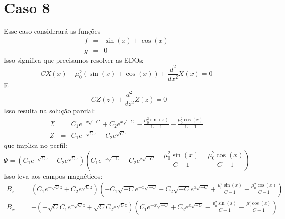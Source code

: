 \documentclass[12pt]{article}
\def\be{\begin{equation}}
\def\ee{\end{equation}}
\def\bea{\begin{eqnarray*}}
\def\eea{\end{eqnarray*}}
\theoremstyle{definition}
\numberwithin{equation}{section}
\begin{document}
        \section{Caso 8}
        Esse caso considerará as funções
        \bea
            f &=& \sin{\left(x \right)} + \cos{\left(x \right)} \\
            g &=& 0
        \eea
        Isso significa que precisamos resolver as EDOs:
        \be
            C X{\left(x \right)} + \mu_{0}^{2} \left(\sin{\left(x \right)} + \cos{\left(x \right)}\right) + \frac{d^{2}}{d x^{2}} X{\left(x \right)} = 0
        \ee
        E
        \be
            - C Z{\left(z \right)} + \frac{d^{2}}{d z^{2}} Z{\left(z \right)} = 0
        \ee
        Isso resulta na solução parcial:
        \bea
            X &=& C_{1} e^{- x \sqrt{- C}} + C_{2} e^{x \sqrt{- C}} - \frac{\mu_{0}^{2} \sin{\left(x \right)}}{C - 1} - \frac{\mu_{0}^{2} \cos{\left(x \right)}}{C - 1} \\
            Z &=& C_{1} e^{- \sqrt{C} z} + C_{2} e^{\sqrt{C} z}
        \eea
        que implica no perfil:
        \be
            \Psi = \left(C_{1} e^{- \sqrt{C} z} + C_{2} e^{\sqrt{C} z}\right) \left(C_{1} e^{- x \sqrt{- C}} + C_{2} e^{x \sqrt{- C}} - \frac{\mu_{0}^{2} \sin{\left(x \right)}}{C - 1} - \frac{\mu_{0}^{2} \cos{\left(x \right)}}{C - 1}\right)
        \ee
        Isso leva aos campos magnéticos:
        \bea
            B_z &=& \left(C_{1} e^{- \sqrt{C} z} + C_{2} e^{\sqrt{C} z}\right) \left(- C_{1} \sqrt{- C} e^{- x \sqrt{- C}} + C_{2} \sqrt{- C} e^{x \sqrt{- C}} + \frac{\mu_{0}^{2} \sin{\left(x \right)}}{C - 1} - \frac{\mu_{0}^{2} \cos{\left(x \right)}}{C - 1}\right)\\
            B_x &=& - \left(- \sqrt{C} C_{1} e^{- \sqrt{C} z} + \sqrt{C} C_{2} e^{\sqrt{C} z}\right) \left(C_{1} e^{- x \sqrt{- C}} + C_{2} e^{x \sqrt{- C}} - \frac{\mu_{0}^{2} \sin{\left(x \right)}}{C - 1} - \frac{\mu_{0}^{2} \cos{\left(x \right)}}{C - 1}\right)
        \eea
        
\end{document}
